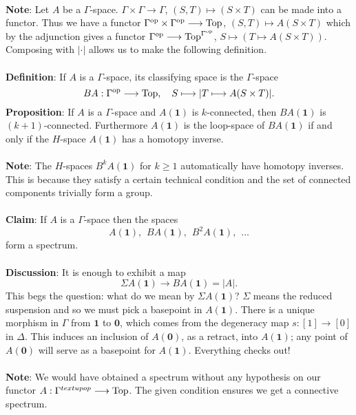 \documentclass[11pt]{article}
\begin{document}
\begin{Jandr GammaCat notes}
\\
\textbf{Note}: Let $A$ be a $\Gamma$-space. $\Gamma\times\Gamma\to\Gamma$, $(S,T)\mapsto (S\times T)$ can be made into a functor. Thus we have a functor 
$\Gamma^{\textup{op}}\times\Gamma^{\textup{op}}\to\textup{Top}$, $(S,T)\mapsto A(S\times T)$ which by the adjunction gives a functor $\Gamma^{\textup{op}}\to\textup{Top}^{\Gamma^{\textup{op}}}$, $S\mapsto (T\mapsto A(S\times T))$. Composing with $|\cdot|$ allows us to make the following definition.\\
\\
\textbf{Definition}: If $A$ is a $\Gamma$-space, its classifying space is the $\Gamma$-space
\[BA:\Gamma^{\textup{op}}\to\textup{Top},
\hspace{10pt}
S\mapsto |T\mapsto A(S\times T)|.\]
\textbf{Proposition}: If $A$ is a $\Gamma$-space and $A(\textbf{1})$ is $k$-connected, then $BA(\textbf{1})$ is $(k+1)$-connected. Furthermore $A(\textbf{1})$ is the loop-space of $BA(\textbf{1})$ if and only if the $H$-space $A(\textbf{1})$ has a homotopy inverse.\\
\\
\textbf{Note}: The $H$-spaces $B^k A(\textbf{1})$ for $k\geq 1$ automatically have homotopy inverses. This is because they satisfy a certain technical condition and the set of connected components trivially form a group.\\
\\
\textbf{Claim}: If $A$ is a $\Gamma$-space then the spaces 
\[A(\textbf{1}),\hspace{5pt}
BA(\textbf{1}),\hspace{5pt}
B^2A(\textbf{1}),\hspace{5pt}\ldots\]
form a spectrum.\\
\\
\textbf{Discussion}: It is enough to exhibit a map
\[\Sigma A(\textbf{1})\to BA(\textbf{1})=|A|.\]
This begs the question: what do we mean by $\Sigma A(\textbf{1})$? $\Sigma$ means the reduced suspension and so we must pick a basepoint in $A(\textbf{1})$. There is a unique morphism in $\Gamma$ from $\textbf{1}$ to $\textbf{0}$, which comes from the degeneracy map $s:[1]\to [0]$ in $\Delta$. This induces an inclusion of $A(\textbf{0})$, as a retract, into $A(\textbf{1})$; any point of $A(\textbf{0})$ will serve as a basepoint for $A(\textbf{1})$. Everything checks out!\\
\\
\textbf{Note}: We would have obtained a spectrum without any hypothesis on our functor $A:\Gamma^{textup{op}}\to\textup{Top}$. The given condition ensures we get a connective spectrum.\\

\end{Jandr GammaCat notes}
\end{document}
